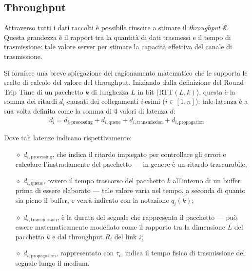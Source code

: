 \vspace{20px}\subsection{Throughput}\label{throughput}

Attraverso tutti i dati raccolti è possibile riuscire a stimare il \textsl{throughput} $\mathcal{S}$. Questa grandezza è il rapport tra la quantità di dati trasmessi e il tempo di trasmissione: tale valore server per stimare la capacità effettiva del canale di trasmissione.

Si fornisce una breve spiegazione del ragionamento matematico che le supporta le scelte di calcolo del valore del throughput. Iniziando dalla definizione del Round Trip Time di un pacchetto $k$ di lunghezza $L$ in bit (RTT$(L, k)$), questa è la somma dei ritardi $d_i$ causati dei collegamenti \textit{i}-esimi ($i \in [1, n]$); tale latenza è a sua volta definita come la somma di 4 valori di latenza $d$:
\begin{gather*}
    d_i = d_{i, \text{processing}} + d_{i, \text{queue}} + d_{i, \text{transmission}} + d_{i, \text{propagation}}
\end{gather*}

\noindent Dove tali latenze indicano rispettivamente:

\vspace{-3px}
\begin{itemize}
    \setlength{\itemsep}{-2px}
    \item[$\diamond$] $d_{i, \text{processing}}$, che indica il ritardo impiegato per controllare gli errori e calcolare l'instradamente del pacchetto — in genere è un ritardo trascurabile;
    \item[$\diamond$] $d_{i, \text{queue}}$, ovvero il tempo trascorso del pacchetto $k$ all'interno di un buffer prima di essere elaborato — tale valore varia nel tempo, a seconda di quanto sia pieno il buffer, e verrà indicato con la notazione $q_i(k)$;
    \item[$\diamond$] $d_{i, \text{transmission}}$, è la durata del segnale che rappresenta il pacchetto — può essere matematicamente modellato come il rapporto tra la dimensione $L$ del pacchetto $k$ e dal throughput $R_i$ del link $i$;
    \item[$\diamond$] $d_{i, \text{propagation}}$, rappresentato con $\tau_i$, indica il tempo fisico di trasmissione del segnale lungo il medium.
\end{itemize}


